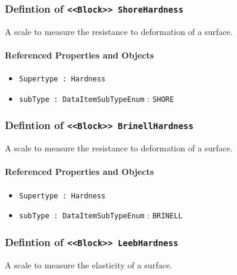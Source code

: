 \subsubsection{Defintion of \texttt{<<Block>> ShoreHardness}}
  \label{type:ShoreHardness}

\FloatBarrier

A scale to measure the resistance to deformation of a surface.

\FloatBarrier
\paragraph{Referenced Properties and Objects}

\begin{itemize}
\item \texttt{Supertype : Hardness}

\item \texttt{subType : DataItemSubTypeEnum} : \texttt{SHORE}

\end{itemize}
\FloatBarrier
\subsubsection{Defintion of \texttt{<<Block>> BrinellHardness}}
  \label{type:BrinellHardness}

\FloatBarrier

A scale to measure the resistance to deformation of a surface.

\FloatBarrier
\paragraph{Referenced Properties and Objects}

\begin{itemize}
\item \texttt{Supertype : Hardness}

\item \texttt{subType : DataItemSubTypeEnum} : \texttt{BRINELL}

\end{itemize}
\FloatBarrier
\subsubsection{Defintion of \texttt{<<Block>> LeebHardness}}
  \label{type:LeebHardness}

\FloatBarrier

A scale to measure the elasticity of a surface.

